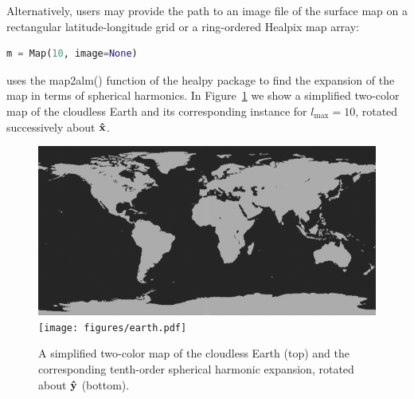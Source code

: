 \documentclass[modern]{aastex61}
\begin{document}
Alternatively, users may provide the path to an image file of the
surface map on a rectangular latitude-longitude grid or a ring-ordered
\textsf{Healpix} map array:
%
\begin{lstlisting}[language=Python,firstnumber=last]
m = Map(10, image=None)
\end{lstlisting}
%
\starry uses the \textsf{map2alm()} function
of the \textsf{healpy} package to find the expansion of the map in
terms of spherical harmonics. In Figure~\ref{fig:earth} we show a
simplified two-color map of the cloudless Earth and its corresponding
\starry instance for
$l_\mathrm{max} = 10$, rotated successively about $\mathbf{\hat{x}}$.
%
\begin{figure}[ht!]
    \begin{centering}
    \includegraphics[width=0.8\linewidth]{../starry/maps/earth.jpg}
    \\[1em]
    \texttt{[image: figures/earth.pdf]}
    \caption{\label{fig:earth}
             A simplified two-color map of the cloudless Earth (top) and the
             corresponding tenth-order spherical harmonic expansion,
             rotated about $\mathbf{\hat{y}}$ (bottom).}
    \end{centering}
\end{figure}
%

\end{document}
